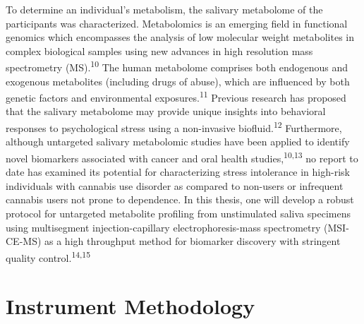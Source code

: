 \documentclass[journal=jacsat,manuscript=article]{achemso}
\begin{document}
To determine an individual's metabolism, the salivary metabolome of the
participants was characterized. Metabolomics is an emerging field in
functional genomics which encompasses the analysis of low molecular
weight metabolites in complex biological samples using new advances in
high resolution mass spectrometry (MS).\textsuperscript{10} The human
metabolome comprises both endogenous and exogenous metabolites
(including drugs of abuse), which are influenced by both genetic factors
and environmental exposures.\textsuperscript{11} Previous research has
proposed that the salivary metabolome may provide unique insights into
behavioral responses to psychological stress using a non-invasive
biofluid.\textsuperscript{12} Furthermore, although untargeted salivary
metabolomic studies have been applied to identify novel biomarkers
associated with cancer and oral health studies,\textsuperscript{10,13}
no report to date has examined its potential for characterizing stress
intolerance in high-risk individuals with cannabis use disorder as
compared to non-users or infrequent cannabis users not prone to
dependence. In this thesis, one will develop a robust protocol for
untargeted metabolite profiling from unstimulated saliva specimens using
multisegment injection-capillary electrophoresis-mass spectrometry
(MSI-CE-MS) as a high throughput method for biomarker discovery with
stringent quality control.\textsuperscript{14,15}

\hypertarget{instrument-methodology}{%
\section{Instrument Methodology}\label{instrument-methodology}}
\end{document}

